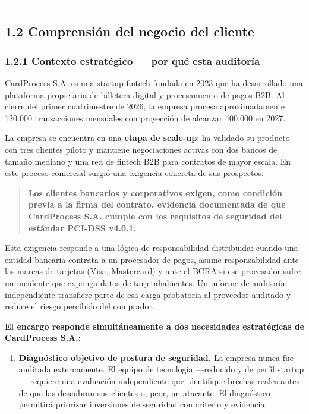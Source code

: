 \documentclass[11pt,a4paper]{article}
\begin{document}
\noindent\rule{\linewidth}{0.4pt}

\subsection{1.2 Comprensión del negocio del cliente}

\subsubsection{1.2.1 Contexto estratégico — por qué esta auditoría}

CardProcess S.A. es una startup fintech fundada en 2023 que ha desarrollado una plataforma propietaria de billetera digital y procesamiento de pagos B2B. Al cierre del primer cuatrimestre de 2026, la empresa procesa aproximadamente 120.000 transacciones mensuales con proyección de alcanzar 400.000 en 2027.

La empresa se encuentra en una \textbf{etapa de scale-up}: ha validado su producto con tres clientes piloto y mantiene negociaciones activas con dos bancos de tamaño mediano y una red de fintech B2B para contratos de mayor escala. En este proceso comercial surgió una exigencia concreta de sus prospectos:

\begin{quote}
\textbf{Los clientes bancarios y corporativos exigen, como condición previa a la firma del contrato, evidencia documentada de que CardProcess S.A. cumple con los requisitos de seguridad del estándar PCI-DSS v4.0.1.}
\end{quote}

Esta exigencia responde a una lógica de responsabilidad distribuida: cuando una entidad bancaria contrata a un procesador de pagos, asume responsabilidad ante las marcas de tarjetas (Visa, Mastercard) y ante el BCRA si ese procesador sufre un incidente que exponga datos de tarjetahabientes. Un informe de auditoría independiente transfiere parte de esa carga probatoria al proveedor auditado y reduce el riesgo percibido del comprador.

\textbf{El encargo responde simultáneamente a dos necesidades estratégicas de CardProcess S.A.:}

\begin{enumerate}[leftmargin=*]
  \item \textbf{Diagnóstico objetivo de postura de seguridad.} La empresa nunca fue auditada externamente. El equipo de tecnología —reducido y de perfil startup— requiere una evaluación independiente que identifique brechas reales antes de que las descubran sus clientes o, peor, un atacante. El diagnóstico permitirá priorizar inversiones de seguridad con criterio y evidencia.
\end{enumerate}
\end{document}
